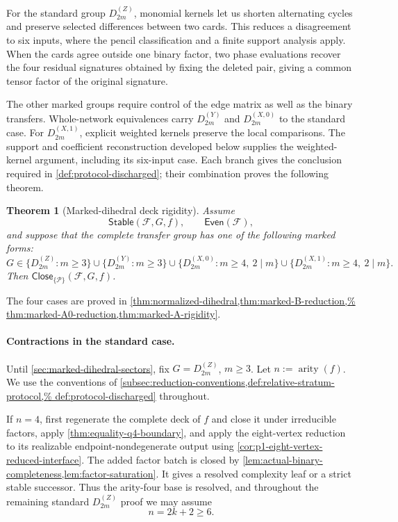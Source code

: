 \documentclass[11pt,letterpaper,onecolumn]{article}
\theoremstyle{plain}
\newtheorem{theorem}{Theorem}[section]
\theoremstyle{definition}
\theoremstyle{remark}
\newcommand{\cF}{\mathcal F}
\newcommand{\cP}{\mathscr P}
\newcommand{\DihZ}[1]{{D_{#1}^{(Z)}}}
\newcommand{\DihY}[1]{{D_{#1}^{(Y)}}}
\newcommand{\DihXzero}[1]{{D_{#1}^{(X,0)}}}
\newcommand{\DihXone}[1]{{D_{#1}^{(X,1)}}}
\newcommand{\Stable}{\mathsf{Stable}}
\newcommand{\Even}{\mathsf{Even}}
\newcommand{\Close}{\mathsf{Close}}
\newcommand{\arity}{\operatorname{arity}}
\begin{document}
For the standard group \(\DihZ{2m}\), monomial kernels let us shorten
alternating cycles and preserve selected differences between two cards.
This reduces a disagreement to six inputs, where the pencil
classification and a finite support analysis apply. When the cards
agree outside one binary factor, two phase evaluations recover the four
residual signatures obtained by fixing the deleted pair, giving a common
tensor factor of the original signature.

The other marked groups require control of the edge matrix as well as
the binary transfers. Whole-network equivalences carry
\(\DihY{2m}\) and \(\DihXzero{2m}\) to the standard case.
For \(\DihXone{2m}\), explicit weighted kernels preserve the local
comparisons. The support and coefficient reconstruction developed below
supplies the weighted-kernel argument, including its six-input case.
Each branch gives the conclusion required in
\cref{def:protocol-discharged}; their combination proves the following theorem.

\begin{theorem}[Marked-dihedral deck rigidity]
\label{thm:marked-dihedral}
Assume
\[
 \Stable(\cF,G,f),\qquad \Even(\cF),
\]
and suppose that the complete transfer group has one of the following marked forms:
\[
 G\in
 \{\DihZ{2m}:m\ge3\}
 \cup
 \{\DihY{2m}:m\ge3\}
 \cup
 \{\DihXzero{2m}:m\ge4,\ 2\mid m\}
 \cup
 \{\DihXone{2m}:m\ge4,\ 2\mid m\}.
\]
Then \(\Close_{\{\cP\}}(\cF,G,f)\).
\end{theorem}

The four cases are proved in
\cref{thm:normalized-dihedral,thm:marked-B-reduction,%
thm:marked-A0-reduction,thm:marked-A-rigidity}.

\paragraph{Contractions in the standard case.}
Until \cref{sec:marked-dihedral-sectors}, fix \(G=\DihZ{2m}\),
\(m\ge3\). Let \(n:=\arity(f)\).  We use the conventions of
\cref{subsec:reduction-conventions,def:relative-stratum-protocol,%
def:protocol-discharged} throughout.

If \(n=4\), first regenerate the complete deck of \(f\) and close it under
irreducible factors, apply \cref{thm:equality-q4-boundary}, and apply the eight-vertex reduction to its realizable
endpoint-nondegenerate output using
\cref{cor:p1-eight-vertex-reduced-interface}.  The added factor batch is
closed by \cref{lem:actual-binary-completeness,lem:factor-saturation}. It
gives a resolved complexity leaf or a strict stable successor.  Thus the arity-four
base is resolved, and throughout the remaining standard \(\DihZ{2m}\)
proof we may assume
\[
 n=2k+2\ge6.
\]
\end{document}
